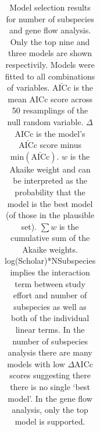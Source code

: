 \begin{landscape}
\begin{table}[t]
\centering
\caption[Model selection results]{
Model selection results for number of subspecies and gene flow analysis. 
Only the top nine and three models are shown respectivily.
Models were fitted to all combinations of variables.
$\bar{\text{AICc}}$ is the mean AICc score across 50 resamplings of the null random variable. 
$\Delta$AICc is the model's $\bar{\text{AICc}}$ score minus $\text{min}(\bar{\text{AICc}})$. 
$w$ is the Akaike weight and can be interpreted as the probability that the model is the best model (of those in the plausible set).
$\sum w$ is the cumulative sum of the Akaike weights.
log(Scholar)*NSubspecies implies the interaction term between study effort and number of subspecies as well as both of the individual linear terms.
In the number of subspecies analysis there are many models with low $\Delta$AICc scores suggesting there there is no single `best model'.
In the gene flow analysis, only the top model is supported.
}

\begin{tabular}{@{}>{\footnotesize}lrrrr@{}}


\end{tabular}
\end{table}
\end{landscape}

